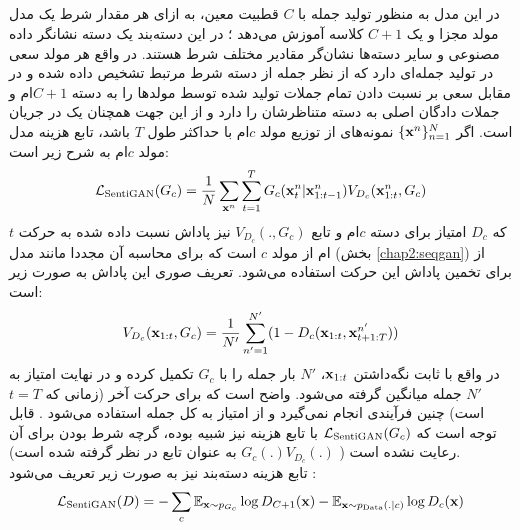 \subsection{}
در این مدل به منظور تولید جمله با $C$ قطبیت معین، به ازای هر مقدار شرط یک مدل مولد مجزا و یک
 $C+1$
کلاسه آموزش می‌دهد \cite{sentigan}؛ در این دسته‌بند یک دسته نشانگر داده مصنوعی و سایر دسته‌ها نشان‌گر مقادیر مختلف شرط هستند. در واقع هر مولد سعی در تولید جمله‌ای دارد که از نظر \classifier{} جمله از دسته شرط مرتبط تشخیص داده شده و در مقابل \classifier{} سعی بر نسبت دادن تمام جملات تولید شده توسط مولد‌ها را به دسته $C+1$ام و جملات دادگان اصلی به دسته متناظرشان را دارد و از این جهت همچنان یک \minmaxgame{} در جریان است. اگر
$\{ {\bf x}^n \}_{n=1}^N$
نمونه‌های از توزیع مولد $c$ام با حداکثر طول $T$ باشد، تابع هزینه مدل مولد $c$ام به شرح زیر است:
\begin{align}
	{\mathcal{L}}_\text{SentiGAN}(G_c) = \frac{1}{N}
	\sum_{{\bf x}^n} \sum_{t=1}^{T}
	G_c({\bf x}^n_t|{\bf x}^n_{1:t-1})
	V_{D_c}({\bf x}^n_{1:t}, G_c)
\end{align}
که $D_c$ امتیاز \discriminator{} برای دسته $c$ام و تابع $V_{D_c}(., G_c)$ نیز پاداش نسبت داده شده به حرکت $t$ام از مولد $c$ است که برای محاسبه آن مجددا مانند مدل  (بخش \ref{chap2:seqgan}) از  \montecarlosearch{} برای تخمین پاداش این حرکت استفاده می‌شود. تعریف صوری این پاداش به صورت زیر است:
\begin{align}
	V_{D_c}({\bf x}_{1:t}, G_c) = \frac{1}{N'} \sum_{n'=1}^{N'} (1 - D_c({\bf x}_{1:t}, {\bf x}^{n'}_{t+1:T}))
\end{align}
در واقع با ثابت نگه‌داشتن ${\bf x}_{1:t}$،
$N'$
بار جمله را با $G_c$ تکمیل کرده و در نهایت امتیاز \discriminator{} به  $N'$ جمله میانگین گرفته می‌شود. واضح است که برای حرکت آخر (زمانی که $t=T$ است) چنین فرآیندی انجام نمی‌گیرد و از امتیاز \discriminator{} به کل جمله استفاده می‌شود \cite{sentigan}. قابل توجه است که ${\mathcal{L}}_\text{SentiGAN}(G_c)$ با تابع هزینه \wgan{} نیز شبیه بوده، گرچه شرط  بودن برای آن رعایت نشده است
( $G_c(.)V_{D_c}(.)$
به عنوان تابع \critic{} در نظر گرفته شده است).
\\
تابع هزینه دسته‌بند نیز به صورت زیر تعریف می‌شود \cite{sentigan}:
\begin{align}
	{\mathcal{L}}_\text{SentiGAN} (D) =
	- \sum_c \mathbb E_{{\bf x} \sim p_{G_c}} \log D_{C+1} ({\bf x})
	- \mathbb E_{{\bf x} \sim p_\text{Data}(.|c)} \log D_c({\bf x})
\end{align}

